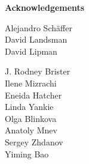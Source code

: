 \documentclass[landscape]{slides}
\begin{document}
\begin{slide}

\large
\begin{center}
\large{\textbf{Acknowledgements}} \\

\normalsize
\vspace{0.5in}

Alejandro Sch\"{a}ffer \\
David Landsman \\
David Lipman

\vspace{0.5in}

J. Rodney Brister \\
Ilene Mizrachi \\
Eneida Hatcher \\
Linda Yankie \\
Olga Blinkova \\
Anatoly Mnev \\
Sergey Zhdanov \\ 
Yiming Bao \\

\end{center}

\vfill
\end{slide}
\end{document}
